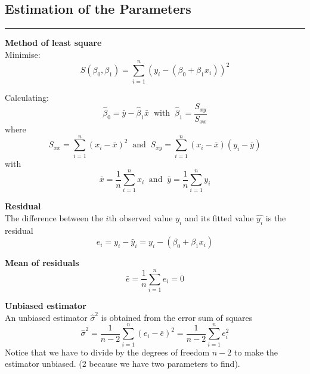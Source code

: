 \subsection{Estimation of the Parameters}
\noindent\rule[\linienAbstand]{\linewidth}{\linienDicke}
\textbf{Method of least square}\\
Minimise:
\begin{equation}
  S(\beta_0, \beta_1) = \sum_{i=1}^n(y_i-(\beta_0 + \beta_1x_i))^2
\end{equation}

Calculating:
\begin{equation}
  \hat{\beta}_0 = \bar{y} - \hat{\beta}_1\bar{x} \;\;\text{with}\;\; \hat{\beta}_1 = \frac{S_{xy}}{S_{xx}}
\end{equation}
where
\begin{equation}
  S_{xx} =  \sum^n_{i=1}(x_i - \bar{x})^2 \;\;\text{and}\;\; S_{xy} =  \sum^n_{i=1}(x_i - \bar{x})(y_i - \bar{y})
\end{equation}
with
\begin{equation}
  \bar{x} = \frac{1}{n}\sum_{i=1}^n x_i  \;\;\text{and}\;\; \bar{y} = \frac{1}{n}\sum_{i=1}^n y_i
\end{equation}

\textbf{Residual}\\
The difference between the $i$th observed value $y_i$ and its fitted value $\hat{y_i}$ is the residual
\begin{equation}
  e_i = y_i - \hat{y}_i = y_i - (\beta_0 + \beta_1x_i)
\end{equation}

\textbf{Mean of residuals}\\
\begin{equation}
  \bar{e} = \frac{1}{n} \sum_{i=1}^n e_i = 0
\end{equation}

\textbf{Unbiased estimator}\\
An unbiased estimator $\hat{\sigma}^2$  is obtained from the error sum of squares
\begin{equation}
  \hat{\sigma}^2 = \frac{1}{n - 2} \sum_{i=1}^n (e_i - \bar{e})^2 = \frac{1}{n - 2} \sum_{i=1}^n e_i^2
\end{equation}
Notice that we have to divide by the degrees of freedom $n - 2$ to make the estimator unbiased. (2 because we have two parameters to find).\\

